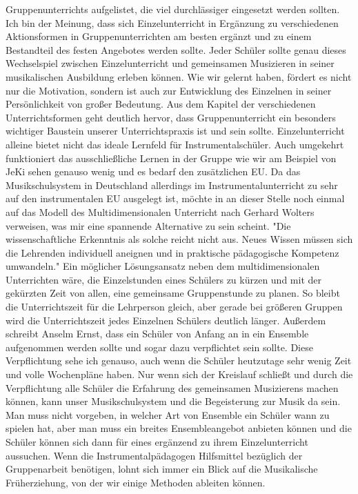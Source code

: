 Gruppenunterrichts aufgelistet, die viel durchlässiger eingesetzt werden
sollten. Ich bin der Meinung, dass sich Einzelunterricht in Ergänzung zu
verschiedenen Aktionsformen in Gruppenunterrichten am besten ergänzt und zu einem
Bestandteil des festen Angebotes werden sollte. 
Jeder Schüler sollte genau dieses Wechselspiel zwischen
Einzelunterricht und gemeinsamen Musizieren in seiner musikalischen Ausbildung
erleben können. Wie wir gelernt haben, fördert es nicht nur die Motivation,
sondern ist auch zur Entwicklung des Einzelnen in seiner Persönlichkeit von
großer Bedeutung. 
Aus dem Kapitel der verschiedenen Unterrichtsformen geht deutlich hervor, dass
Gruppenunterricht ein besonders wichtiger Baustein unserer Unterrichtspraxis
ist und sein sollte. Einzelunterricht alleine bietet nicht das ideale Lernfeld
für Instrumentalschüler. Auch umgekehrt funktioniert das ausschließliche Lernen
in der Gruppe wie wir am Beispiel von JeKi sehen genauso wenig und es bedarf den
zusätzlichen EU. Da das Musikschulsystem in Deutschland allerdings im
Instrumentalunterricht zu sehr auf den instrumentalen EU ausgelegt ist, möchte
in an dieser Stelle noch einmal auf das Modell des Multidimensionalen Unterricht
nach Gerhard Wolters verweisen, was mir eine spannende Alternative zu sein
scheint. %
"Die wissenschaftliche Erkenntnis als solche reicht nicht aus. Neues Wissen
müssen sich die Lehrenden individuell aneignen und in praktische pädagogische
Kompetenz umwandeln." \autocite[10]{losert:die_kunst_zu_unterrichten} Ein
möglicher Lösungsansatz neben dem multidimensionalen Unterrichten wäre, die
Einzelstunden eines Schülers zu kürzen und mit der gekürzten Zeit von allen, eine
gemeinsame Gruppenstunde zu planen. So bleibt die Unterrichtszeit für die
Lehrperson gleich, aber gerade bei größeren Gruppen wird die Unterrichtszeit
jedes Einzelnen Schülers deutlich länger.\autocite[33]{losert:die_kunst_zu_unterrichten}
Außerdem schreibt Anselm Ernst, dass ein Schüler von Anfang an in ein Ensemble
aufgenommen werden sollte und sogar dazu verpflichtet sein sollte. \autocite[61]{ernst:die_zukunftsfaehige_musikschule}
Diese Verpflichtung sehe ich genauso, auch wenn die Schüler heutzutage sehr
wenig Zeit und volle Wochenpläne haben. Nur wenn sich der Kreislauf schließt und
durch die Verpflichtung alle Schüler die Erfahrung des gemeinsamen
Musizierens machen können, kann unser Musikschulsystem und die Begeisterung zur
Musik da sein. Man muss nicht vorgeben, in welcher Art von Ensemble ein Schüler
wann zu spielen hat, aber man muss ein breites Ensembleangebot anbieten können
und die Schüler können sich dann für eines ergänzend zu ihrem Einzelunterricht
aussuchen. Wenn die Instrumentalpädagogen Hilfsmittel bezüglich der
Gruppenarbeit benötigen, lohnt sich immer ein Blick auf die Musikalische
Früherziehung, von der wir einige Methoden ableiten können. 

